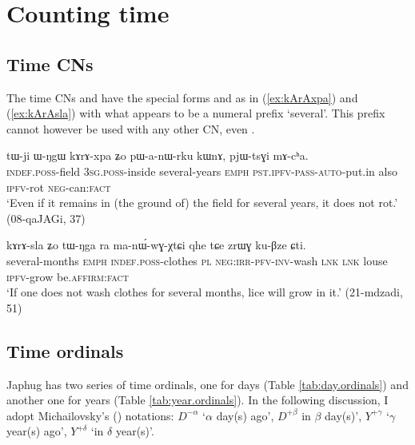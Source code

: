 \section{Counting time} \label{sec:time}
\subsection{Time CNs} \label{sec:CN.time}
  

The time CNs  and  have the special forms  and  as in (\ref{ex:kArAxpa}) and (\ref{ex:kArAsla}) with what appears to be a numeral prefix  `several'. This prefix cannot however be used with any other CN, even . 

\begin{exe}
\ex \label{ex:kArAxpa}
\gll tɯ-ji ɯ-ŋgɯ kɤrɤ-xpa ʑo pɯ-a-nɯ-rku kɯnɤ, pjɯ-tsɣi mɤ-cʰa. \\
\textsc{indef}.\textsc{poss}-field \textsc{3sg}.\textsc{poss}-inside several-years \textsc{emph} \textsc{pst}.\textsc{ipfv}-\textsc{pass}-\textsc{auto}-put.in also \textsc{ipfv}-rot \textsc{neg}-can:\textsc{fact} \\
\glt `Even if it remains in (the ground of) the field for several years, it does not rot.' (08-qaJAGi, 37)
\end{exe}

\begin{exe}
\ex \label{ex:kArAsla}
\gll
kɤrɤ-sla ʑo tɯ-ŋga ra ma-nɯ́-wɣ-χtɕi qhe tɕe zrɯɣ ku-βze ɕti.  \\
several-months \textsc{emph} \textsc{indef}.\textsc{poss}-clothes \textsc{pl} \textsc{neg}:\textsc{irr}-\textsc{pfv}-\textsc{inv}-wash \textsc{lnk} \textsc{lnk} louse \textsc{ipfv}-grow be.\textsc{affirm}:\textsc{fact} \\
\glt `If one does not wash clothes for several months, lice will grow in it.' (21-mdzadi, 51)
\end{exe}


 


\subsection{Time ordinals} \label{sec:time.ordinals}
Japhug has two series of time ordinals, one for days (Table \ref{tab:day.ordinals}) and another one for years (Table \ref{tab:year.ordinals}).  In the following discussion, I adopt Michailovsky's (\citeyear{michailovsky03ordinals}) notations: $D^{-\alpha}$ `$\alpha$ day(s) ago', $D^{+\beta}$ in $\beta$ day(s)', $Y^{+ \gamma}$ `$\gamma$ year(s) ago', $Y^{+ \delta}$  `in $\delta$ year(s)'.

